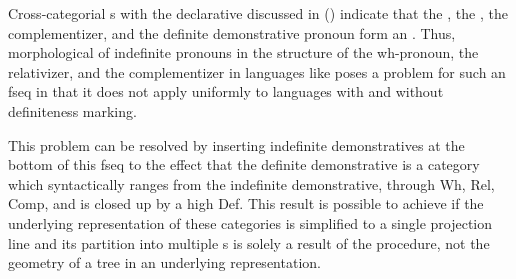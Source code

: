 \noindent Cross-categorial s with the declarative  discussed in \citeauthor{BaunazLander2017} (\citeyear{BaunazLander2017,BaunazLander2018,Baunaz-Lander-Glossa}) indicate that the , the , the complementizer, and the definite demonstrative pronoun form an . Thus, morphological  of indefinite  pronouns in the structure of the wh-pronoun, the relativizer, and the complementizer in languages like  poses a problem for such an fseq in that it does not apply uniformly to languages with and without definiteness marking.
\par
This problem can be resolved by inserting indefinite demonstratives at the bottom of this fseq to the effect that the definite demonstrative is a category which syntactically ranges from the indefinite demonstrative, through Wh, Rel, Comp, and is closed up by a high Def. This result is possible to achieve if the underlying representation of these categories is simplified to a single projection line and its partition into multiple s is solely a result of the  procedure, not the geometry of a tree in an underlying representation.
